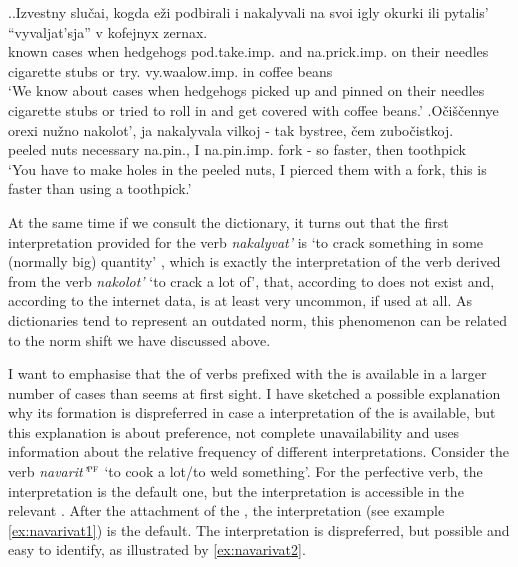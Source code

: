 \ex.\label{ex:nakalyvat}\ag.Izvestny slu\v{c}ai, kogda e\v{z}i podbirali i nakalyvali na svoi igly okurki ili pytalis' ``vyvaljat'sja'' v kofejnyx zernax.\\
known cases when hedgehogs pod.take.imp. and na.prick.imp. on their needles {cigarette stubs} or try. vy.waalow.imp. in coffee beans\\
\trans `We know about cases when hedgehogs picked up and pinned on their needles cigarette stubs or tried to roll in and get covered with coffee beans.'
\bg.O\v{c}i\v{s}\v{c}ennye orexi nu\v{z}no nakolot', ja nakalyvala vilkoj - tak bystree, \v{c}em zubo\v{c}istkoj.\\
peeled nuts necessary na.pin., I na.pin.imp. fork - so faster, then toothpick\\
\trans `You have to make holes in the peeled nuts, I pierced them with a fork, this is faster than using a toothpick.'

At the same time if we consult the dictionary, it turns out that the first interpretation provided for the verb \textit{nakalyvat'} is `to crack something in some (normally big) quantity' \citep{Efremova:00}, which is exactly the interpretation of the  verb derived from the verb \textit{nakolot'} `to crack a lot of', that, according to \citet{Svenonius:04b} does not exist and, according to the internet data, is at least very uncommon, if used at all. As dictionaries tend to represent an outdated norm, this phenomenon can be related to the norm shift we have discussed above.

I want to emphasise that the  of verbs prefixed with the   is available in a larger number of cases than seems at first sight. I have sketched a possible explanation why its formation is dispreferred in case a  interpretation of the  is available, but this explanation is about preference, not complete unavailability and uses information about the relative frequency of different interpretations. Consider the verb \textit{navarit'}$^{\textsc{pf}}$ `to cook a lot/to weld something'. For the perfective verb, the  interpretation is the default one, but the  interpretation is accessible in the relevant . After the attachment of the , the  interpretation (see example \ref{ex:navarivat1}) is the default. The  interpretation is dispreferred, but possible and easy to identify, as illustrated by \ref{ex:navarivat2}.

